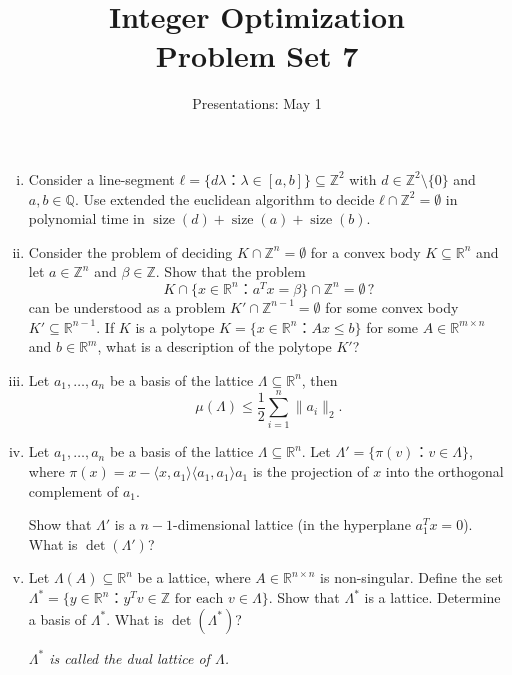 \documentclass[11pt,a4paper]{article}
\title{Integer Optimization  \\ Problem Set 7 }
\date{Presentations: May 1}
\DeclareMathOperator{\size}{size}
\begin{document}
\maketitle 

\begin{enumerate}[i)]
\item  Consider a line-segment  $ℓ = \{ d λ ： λ ∈ [a,b]\} ⊆ ℤ^2 $ with $d ∈ℤ^2 \setminus \{0\}$ and $a,b ∈ℚ$. Use extended the euclidean algorithm to decide $ℓ ∩ ℤ^2 = \emptyset$ in polynomial time in $\size(d) + \size(a) + \size(b)$.
\item Consider the problem of deciding $ K ∩ ℤ^n = \emptyset$ for a convex body $K⊆ℝ^n$ and let $a ∈ℤ^n$ and $β ∈ ℤ$. Show that the problem
  \begin{displaymath}
     K ∩ \{x ∈ ℝ^n ：a^Tx = β\} ∩  ℤ^n = \emptyset \, ?
   \end{displaymath}
   can be understood as a problem $ K' ∩ ℤ^{n-1} = \emptyset$ for some convex body $K' ⊆ ℝ^{n-1}$. If $K$  is a polytope $K = \{ x ∈ ℝ^n ： Ax ≤ b \}$ for some $A ∈ ℝ^{m ×n}$ and $b ∈ ℝ^m$, what is a description of the polytope $K'$?
 \item Let $a_1,\dots,a_n$ be a basis of the lattice $Λ ⊆ ℝ^n$, then 
   \begin{displaymath}
     μ(Λ) ≤ \frac{1}{2}∑_{i=1}^n \|a_i\|_2.    
   \end{displaymath}

 \item Let $a_1,\dots,a_n$ be a basis of the lattice $Λ ⊆ ℝ^n$. Let $Λ' = \{ π(v) ： v ∈ Λ\}$, where $π(x) = x - 〈x,a_1 〉 〈a_1,a_1 〉 a_1$ is the projection of $x$ into the orthogonal complement of $a_1$.

   Show that $Λ'$ is a $n-1$-dimensional lattice (in the hyperplane $a_1^T x = 0$). What is $\det(Λ')$?

 \item Let $Λ(A)⊆ℝ^n$ be a lattice, where $A ∈ ℝ^{n ×n}$ is non-singular. Define the set $Λ^* = \{ y ∈ ℝ^n ： y^T v ∈ℤ \text{ for each } v ∈ Λ \}$. Show that  $Λ^*$ is a lattice. Determine a basis of $Λ^*$. What is $\det(Λ^*)$?

   \hfill \emph{$Λ^*$ is called the dual lattice of $Λ$.}
\end{enumerate}



%
%


 
\end{document}
